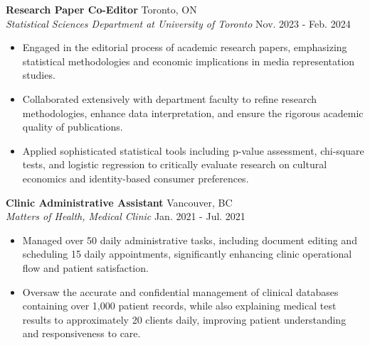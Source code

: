 \documentclass[a4paper,9pt]{extarticle}
\begin{document}
\noindent
\textbf{Research Paper Co-Editor} \hfill Toronto, ON\\ %
\textit{Statistical Sciences Department at University of Toronto} \hfill Nov. 2023 - Feb. 2024  %
\begin{itemize}
    \item Engaged in the editorial process of academic research papers, emphasizing statistical methodologies and economic implications in media representation studies.
    \item Collaborated extensively with department faculty to refine research methodologies, enhance data interpretation, and ensure the rigorous academic quality of publications.
    \item Applied sophisticated statistical tools including p-value assessment, chi-square tests, and logistic regression to critically evaluate research on cultural economics and identity-based consumer preferences.
\end{itemize} 

\noindent
\textbf{Clinic Administrative Assistant} \hfill Vancouver, BC\\ %
\textit{Matters of Health, Medical Clinic} \hfill Jan. 2021 - Jul. 2021 %
\begin{itemize}
    \item Managed over 50 daily administrative tasks, including document editing and scheduling 15 daily appointments, significantly enhancing clinic operational flow and patient satisfaction.
    \item Oversaw the accurate and confidential management of clinical databases containing over 1,000 patient records, while also explaining medical test results to approximately 20 clients daily, improving patient understanding and responsiveness to care.
\end{itemize}

\end{document}
